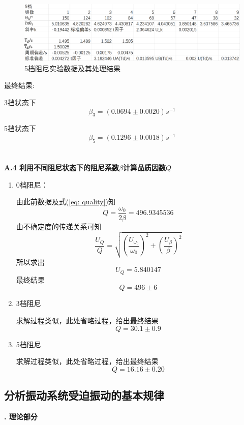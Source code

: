 \documentclass[a4paper,11pt]{article}
\begin{document}
        \begin{figure}[ht]
            \centering
            \includegraphics[scale=0.5]{5档阻尼 数据.png}
            \caption{5档阻尼实验数据及其处理结果}
        \end{figure}

        最终结果:

        3挡状态下
        $$
            \beta_3 = (0.0694 \pm 0.0020)s^{-1}
        $$

        5挡状态下
        $$
            \beta_5 = (0.1296 \pm 0.0018)s^{-1}
        $$
        \\ \\
        \textbf{A.4 利用不同阻尼状态下的阻尼系数$\beta$计算品质因数$Q$}
        \begin{enumerate}
            \item 0档阻尼：

            由此前数据及式(\ref{eq: quality})知
            $$
                Q = \frac{\omega_0}{2\beta} = 496.9345536
            $$
            由不确定度的传递关系可知
            $$
                \frac{U_Q}Q = \sqrt{(\frac{U_{\omega_0}}{\omega_0})^2 + (\frac{U_\beta}\beta)^2}
            $$
            所以求出
            $$
                U_Q = 5.840147
            $$
            最终结果
            $$
                Q = 496 \pm 6
            $$
            \item 3档阻尼
            
            求解过程类似，此处省略过程，给出最终结果
            $$
                Q = 30.1 \pm 0.9
            $$
            \item 5档阻尼
            
            求解过程类似，此处省略过程，给出最终结果
            $$
                Q = 16.16 \pm 0.20
            $$
        \end{enumerate}
        
    \subsection{分析振动系统受迫振动的基本规律}
    \textbf{. 理论部分}
\end{document}
